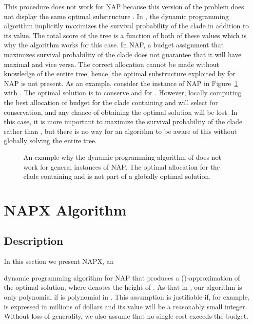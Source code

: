 \documentclass[10pt]{llncs}       \usepackage{graphicx,subfigure}
\begin{document}
This procedure 
does not work for 
NAP because this version of the 
problem does not display the same optimal substructure \cite{pardi07}.  In 
, the dynamic programming algorithm implicitly
maximizes the survival probability of the clade in addition to its
 value.  The total score of the tree is a function of
both of these values which is why the algorithm works for this case.
In  NAP, a budget assignment that maximizes
survival probability of the clade does not guarantee that it will
have maximal  and vice versa. The correct allocation cannot
be made without knowledge of the entire tree; hence, the optimal
substructure exploited by \cite{pardi07} for  NAP
is not present. As an example, consider the instance of NAP in 
Figure~\ref{fig:counter} with .  The optimal solution is to conserve
 and  for . However, locally computing the best 
allocation of budget  for the clade containing  and  will select
 for conservation, and any chance of obtaining the optimal solution will
be lost.  In this case, it is more important to maximize the 
survival probability
of the clade rather than , but there is no way for an
algorithm to be aware of this without globally solving the entire tree.  

\begin{figure}{
     \begin{center}\leavevmode
     \end{center}
  }
  \caption{An example why the dynamic programming algorithm of \cite{pardi07}
does not work for general instances of NAP.  The optimal allocation for the
clade containing  and  is not part of a globally optimal solution.}
  \label{fig:counter}
\end{figure}

\section{NAPX Algorithm}
\label{sec:ptas}

\subsection{Description}

In this section we present NAPX, an 
 
dynamic programming algorithm for  
NAP that produces a ()-approximation of the optimal 
solution, where  denotes the height of 
. As that in \cite{pardi07},
our algorithm is only polynomial if  is polynomial in .
  This assumption is justifiable if, for example,
 is expressed in millions of dollars and its value will be a reasonably
small integer.  Without loss of generality, we also assume that no single
cost exceeds the budget.  
\end{document}
